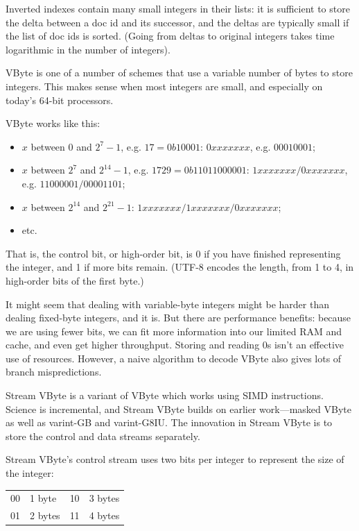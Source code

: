 \documentclass[a4paper]{report}
\begin{document}
Inverted indexes contain many small integers in their lists: it is
sufficient to store the delta between a doc id and its successor, and
the deltas are typically small if the list of doc ids is sorted.
(Going from deltas to original integers takes time logarithmic
in the number of integers).

VByte is one of a number of schemes that use a variable number of
bytes to store integers.  This makes sense when most integers are
small, and especially on today's 64-bit processors.

VByte works like this:
\vspace*{-1em}
\begin{itemize}[noitemsep]
\item $x$ between 0 and $2^7-1$, e.g. $17 = 0b10001$: $0xxx xxxx$, e.g. $0001 0001$;
\item $x$ between $2^7$ and $2^{14}-1$, e.g. $1729 = 0b110 11000001$:
                   $1xxx xxxx/0xxx xxxx$, e.g. $1100 0001/0000 1101$;
\item $x$ between $2^{14}$ and $2^{21}-1$: $1xxx xxxx/1xxx xxxx/0xxx xxxx$;
\item etc.
\end{itemize}
That is, the control bit, or high-order bit, is 0 if you have finished representing the integer,
and 1 if more bits remain. (UTF-8 encodes the length, from 1 to 4, in high-order bits of the first byte.)

It might seem that dealing with variable-byte integers might be
harder than dealing fixed-byte integers, and it is. But there are performance benefits: because we are
using fewer bits, we can fit more information into our limited RAM and
cache, and even get higher throughput. Storing and reading 0s isn't an effective
use of resources. However, a naive algorithm to decode VByte also gives
lots of branch mispredictions.

Stream VByte is a variant of VByte which works using SIMD instructions.
Science is incremental, and Stream VByte builds on earlier work---masked VByte
as well as {\sc varint}-GB and {\sc varint}-G8IU. The innovation in
Stream VByte is to store the control and data streams separately.

Stream VByte's control stream uses two bits per integer to represent the size of the integer:
\begin{center}
\vspace*{-1em}
\begin{tabular}{ll@{~~~~~~~~}ll}
00 & 1 byte & 10 & 3 bytes\\
01 & 2 bytes & 11 & 4 bytes
\end{tabular}
\end{center}
\end{document}
